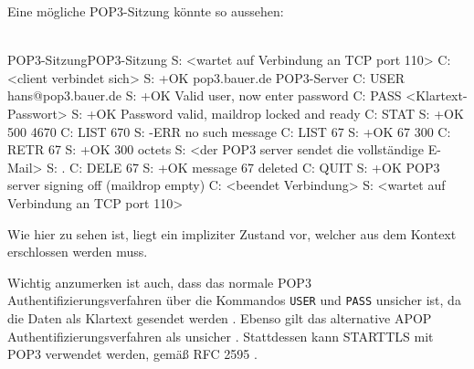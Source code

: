 Eine mögliche POP3-Sitzung könnte so aussehen:
\\
\\
\begin{minipage}{\linewidth}
\begin{mail}{POP3-Sitzung}{POP3-Sitzung}
S: <wartet auf Verbindung an TCP port 110>
C: <client verbindet sich>
S: +OK pop3.bauer.de POP3-Server
C: USER hans@pop3.bauer.de
S: +OK Valid user, now enter password
C: PASS <Klartext-Passwort>
S: +OK Password valid, maildrop locked and ready
C: STAT
S: +OK 500 4670
C: LIST 670
S: -ERR no such message
C: LIST 67
S: +OK 67 300
C: RETR 67
S: +OK 300 octets
S: <der POP3 server sendet die vollständige E-Mail>
S: .
C: DELE 67
S: +OK message 67 deleted
C: QUIT
S: +OK POP3 server signing off (maildrop empty)
C: <beendet Verbindung>
S: <wartet auf Verbindung an TCP port 110>
\end{mail}
\end{minipage}

Wie hier zu sehen ist, liegt ein impliziter Zustand vor, welcher aus dem Kontext erschlossen werden muss.

Wichtig anzumerken ist auch, dass das normale POP3 Authentifizierungsverfahren über die Kommandos \verb#USER# und \verb#PASS# unsicher ist, da die Daten als Klartext gesendet werden . Ebenso gilt das alternative APOP Authentifizierungsverfahren als unsicher .
Stattdessen kann STARTTLS mit POP3 verwendet werden, gemäß RFC 2595 .
